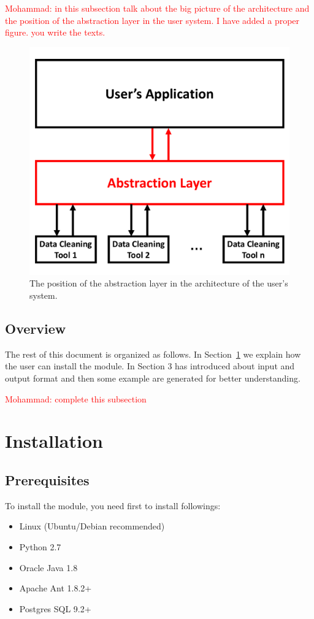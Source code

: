 \documentclass[12pt]{article}
\newcommand{\mohammad}[1]{\textcolor{red}{Mohammad: #1}}
\begin{document}
\mohammad{in this subsection talk about the big picture of the architecture and the position of the abstraction layer in the user system. I have added a proper figure. you write the texts.}
\begin{figure}[!htb]
	\centering
	\includegraphics[scale=0.3]{attachments/architecture}
	\caption{The position of the abstraction layer in the architecture of the user's system.}
	\label{figure:architecture}
\end{figure}

\subsection{Overview}
The rest of this document is organized as follows. In Section~\ref{section:installation} we explain how the user can install the module. In Section 3 has introduced about input and output format and then some example are generated for better understanding.

\mohammad{complete this subsection}


\section{Installation}
\label{section:installation}

\subsection{Prerequisites}
To install the module, you need first to install followings:
\begin{itemize}
	\item Linux (Ubuntu/Debian recommended)
	\item Python 2.7
	\item Oracle Java 1.8
	\item Apache Ant 1.8.2+
	\item Postgres SQL 9.2+
\end{itemize}
\end{document}

